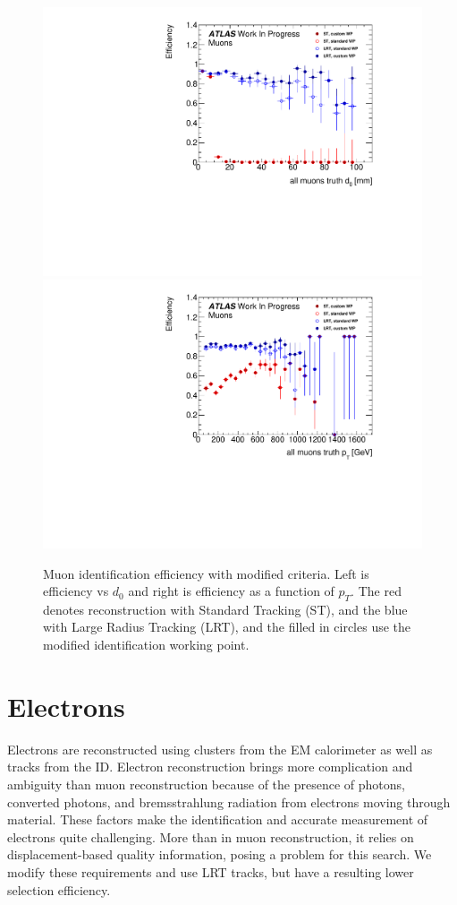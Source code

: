 \begin{figure}[htbp]
\centering
\includegraphics[width=.48\textwidth]{figures/EventReconstruction/wp_m_d0_all_wip.pdf}
\includegraphics[width=.48\textwidth]{figures/EventReconstruction/wp_m_pt_all_wip.pdf}
\caption{Muon identification efficiency with modified criteria. Left is efficiency vs $d_{0}$ and right is efficiency as a function of $p_{T}$. The red denotes reconstruction with Standard Tracking (ST), and the blue with Large Radius Tracking (LRT), and the filled in circles use the modified identification working point. }
\label{fig:cust_muon_eff}
\end{figure}



\section{Electrons}
\label{sec:elecreco}

Electrons are reconstructed using clusters from the \ac{EM} calorimeter as well as tracks from the \ac{ID}. \cite{electron-reco} Electron reconstruction brings more complication and ambiguity than muon reconstruction because of the presence of photons, converted photons, and bremsstrahlung radiation from electrons moving through material. These factors make the identification and accurate measurement of electrons quite challenging. More than in muon reconstruction, it relies on displacement-based quality information, posing a problem for this search. We modify these requirements and use \ac{LRT} tracks, but have a resulting lower selection efficiency. 

